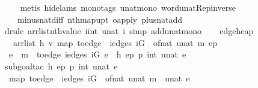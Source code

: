 \begin{isabellebody}
\ \ \ \isamarkupfalse%
\ {\isacharparenleft}metis\ {\isacharparenleft}hide{\isacharunderscore}lams{\isacharcomma}\ mono{\isacharunderscore}tags{\isacharparenright}\ unat{\isacharunderscore}mono\ word{\isacharunderscore}unat{\isachardot}Rep{\isacharunderscore}inverse\ \isanewline
\ \ \ \ minus{\isacharunderscore}nat{\isachardot}diff{\isacharunderscore}{}\ nth{\isacharunderscore}map{\isacharunderscore}upt\ o{\isacharunderscore}apply\ plus{\isacharunderscore}nat{\isachardot}add{\isacharunderscore}{}{\isacharparenright}\isanewline
\ \ \isamarkupfalse%
\ {\isacharparenleft}drule\ arrlist{\isacharunderscore}nth{\isacharunderscore}value{\isacharbrackleft}\ i{\isacharequal}{\isachardoublequoteopen}int\ {\isacharparenleft}unat\ i{\isacharparenright}{\isachardoublequoteclose}{\isacharbrackright}{\isacharcomma}\ {\isacharparenleft}simp\ add{\isacharcolon}unat{\isacharunderscore}mono{\isacharparenright}{\isacharplus}{\isacharparenright}\isanewline
\ \ \isamarkupfalse%
%
\endisatagproof
{\isafoldproof}%
%
\isadelimproof
\isanewline
%
\endisadelimproof
\isanewline
\isanewline
{}\isamarkupfalse%
\ edge{\isacharunderscore}heap{\isacharcolon}\isanewline
\ \ {\isachardoublequoteopen}{\isasymlbrakk}\ arrlist\ h\ v\ {\isacharparenleft}map\ {\isacharparenleft}to{\isacharunderscore}edge\ {\isasymcirc}\ {\isacharparenleft}iedges\ iG\ {\isasymcirc}\ of{\isacharunderscore}nat{\isacharparenright}{\isacharparenright}\ {\isacharbrackleft}{}{\isachardot}{\isachardot}{\isacharless}unat\ m{\isacharbrackright}{\isacharparenright}\ ep{\isacharsemicolon}\isanewline
\ \ e\ {\isacharless}\ m{\isasymrbrakk}\ {\isasymLongrightarrow}\ to{\isacharunderscore}edge\ {\isacharparenleft}{\isacharparenleft}iedges\ iG{\isacharparenright}\ e{\isacharparenright}\ {\isacharequal}\ h\ {\isacharparenleft}ep\ {\isacharplus}\isactrlsub p\ {\isacharparenleft}int\ {\isacharparenleft}unat\ e{\isacharparenright}{\isacharparenright}{\isacharparenright}{\isachardoublequoteclose}\ \isanewline
%
\isadelimproof
\ \ %
\endisadelimproof
%
\isatagproof
{}\isamarkupfalse%
\ {\isacharparenleft}subgoal{\isacharunderscore}tac\ {\isachardoublequoteopen}h\ {\isacharparenleft}ep\ {\isacharplus}\isactrlsub p\ {\isacharparenleft}int\ {\isacharparenleft}unat\ e{\isacharparenright}{\isacharparenright}{\isacharparenright}\ {\isacharequal}\ \isanewline
\ \ {\isacharparenleft}map\ {\isacharparenleft}to{\isacharunderscore}edge\ {\isasymcirc}\ {\isacharparenleft}iedges\ iG\ {\isasymcirc}\ of{\isacharunderscore}nat{\isacharparenright}{\isacharparenright}\ {\isacharbrackleft}{}{\isachardot}{\isachardot}{\isacharless}unat\ m{\isacharbrackright}{\isacharparenright}\ {\isacharbang}\ unat\ e{\isachardoublequoteclose}{\isacharparenright}\isanewline

\end{isabellebody}
